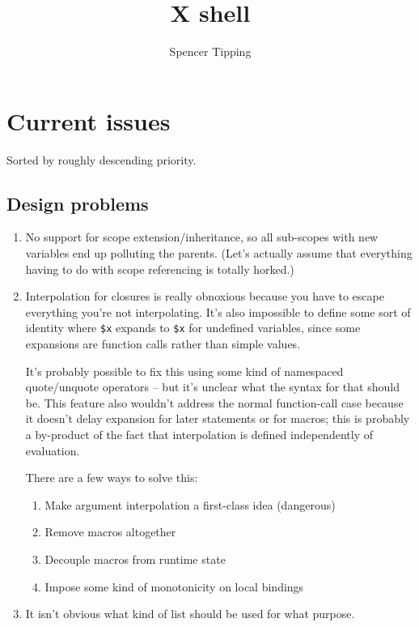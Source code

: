\documentclass{report}
\title{X shell}
\author{Spencer Tipping}
\begin{document}
\maketitle{}
\tableofcontents{}


\chapter{Current issues}\label{chp:current-issues}
  Sorted by roughly descending priority.

\section{Design problems}\label{sec:design-problems}
\begin{enumerate}
\item{}
  \label{item:no-scope-extension}
  No support for scope extension/inheritance, so all sub-scopes with new
  variables end up polluting the parents. (Let's actually assume that
  everything having to do with scope referencing is totally horked.)

\item{}
  \label{item:obnoxious-closures}
  Interpolation for closures is really obnoxious because you have to
  escape everything you're not interpolating. It's also impossible to
  define some sort of identity where \verb|$x| expands to \verb|$x| for
  undefined variables, since some expansions are function calls rather
  than simple values.

  It's probably possible to fix this using some kind of namespaced
  quote/unquote operators -- but it's unclear what the syntax for that
  should be. This feature also wouldn't address the normal function-call
  case because it doesn't delay expansion for later statements or for
  macros; this is probably a by-product of the fact that interpolation is
  defined independently of evaluation.

  There are a few ways to solve this:

\begin{enumerate}
\item{Make argument interpolation a first-class idea (dangerous)}
\item{Remove macros altogether}
\item{Decouple macros from runtime state}
\item{Impose some kind of monotonicity on local bindings}
\end{enumerate}

\item{}
  \label{item:what-kind-of-list}
  It isn't obvious what kind of list should be used for what purpose.


\end{enumerate}
\end{document}
